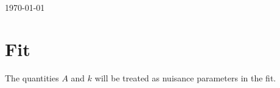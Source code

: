 \documentclass[12pt]{article}
\begin{document}
\today




\section{Fit}
The quantities $A$ and $k$ will be treated as nuisance parameters in the fit.
\end{document}
